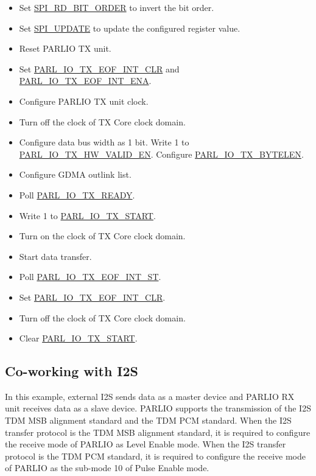 \documentclass[main\_\_EN.tex]{subfiles}
\begin{document}
\begin{itemize}
\begin{itemize}
        \item Set \hyperref[fielddesc:SPIRDBITORDER]{SPI\_RD\_BIT\_ORDER} to invert the bit order.
        \item Set \hyperref[fielddesc:SPIUPDATE]{SPI\_UPDATE} to update the configured register value.   
        \item Reset PARLIO TX unit.
        \item Set \hyperref[fielddesc:PARLIOTXEOFINTCLR]{PARL\_IO\_TX\_EOF\_INT\_CLR} and \hyperref[fielddesc:PARLIOTXEOFINTENA]{PARL\_IO\_TX\_EOF\_INT\_ENA}.
        \item Configure PARLIO TX unit clock.
        \item Turn off the clock of TX Core clock domain.
        \item Configure data bus width as 1 bit. Write 1 to \hyperref[fielddesc:PARLIOTXHWVALIDEN]{PARL\_IO\_TX\_HW\_VALID\_EN}. Configure \hyperref[fielddesc:PARLIOTXBYTELEN]{PARL\_IO\_TX\_BYTELEN}. 
        \item Configure GDMA outlink list. 
        \item Poll \hyperref[fielddesc:PARLIOTXREADY]{PARL\_IO\_TX\_READY}.
        \item Write 1 to \hyperref[fielddesc:PARLIOTXSTART]{PARL\_IO\_TX\_START}.
        \item Turn on the clock of TX Core clock domain.
        \item Start data transfer.
        \item Poll \hyperref[fielddesc:PARLIOTXEOFINTST]{PARL\_IO\_TX\_EOF\_INT\_ST}.
        \item Set \hyperref[fielddesc:PARLIOTXEOFINTCLR]{PARL\_IO\_TX\_EOF\_INT\_CLR}.
        \item Turn off the clock of TX Core clock domain.
        \item Clear \hyperref[fielddesc:PARLIOTXSTART]{PARL\_IO\_TX\_START}.         
    \end{itemize} 
\end{itemize}

\subsection{Co-working with I2S}
In this example, external I2S sends data as a master device and PARLIO RX unit receives data as a slave device. PARLIO supports the transmission of the I2S TDM MSB alignment standard and the TDM PCM standard. When the I2S transfer protocol is the TDM MSB alignment standard, it is required to configure the receive mode of PARLIO as Level Enable mode. When the I2S transfer protocol is the TDM PCM standard, it is required to configure the receive mode of PARLIO as the sub-mode 10 of Pulse Enable mode.
\end{document}
